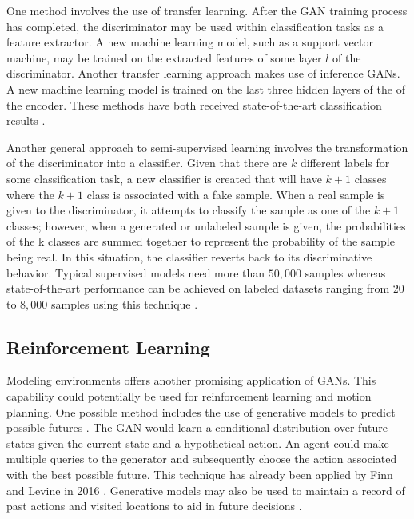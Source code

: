 \documentclass[11pt]{article}
\begin{document}
One method involves the use of transfer learning. After the GAN training process has completed, the discriminator may be used within classification tasks as a feature extractor. A new machine learning model, such as a support vector machine, may be trained on the extracted features of some layer $l$ of the discriminator. Another transfer learning approach makes use of inference GANs. A new machine learning model is trained on the last three hidden layers of the of the encoder. These methods have both received state-of-the-art classification results \citep{2017arXiv171007035C}.

Another general approach to semi-supervised learning involves the transformation of the discriminator into a classifier. Given that there are $k$ different labels for some classification task, a new classifier is created that will have $k + 1$ classes where the $k + 1$ class is associated with a fake sample. When a real sample is given to the discriminator, it attempts to classify the sample as one of the $k + 1$ classes; however, when a generated or unlabeled sample is given, the probabilities of the k classes are summed together to represent the probability of the sample being real. In this situation, the classifier reverts back to its discriminative behavior. Typical supervised models need more than $50,000$ samples whereas state-of-the-art performance can be achieved on labeled datasets ranging from $20$ to $8,000$ samples using this technique \citep{2017arXiv170100160G}.

\subsection{Reinforcement Learning}
Modeling environments offers another promising application of GANs. This capability could potentially be used for reinforcement learning and motion planning. One possible method includes the use of generative models to predict possible futures \citep{2017arXiv170100160G}. The GAN would learn a conditional distribution over future states given the current state and a hypothetical action. An agent could make multiple queries to the generator and subsequently choose the action associated with the best possible future. This technique has already been applied by Finn and Levine in 2016 \citep{2016arXiv161000696F}. Generative models may also be used to maintain a record of past actions and visited locations to aid in future decisions \citep{2017arXiv170100160G}.
\end{document}
